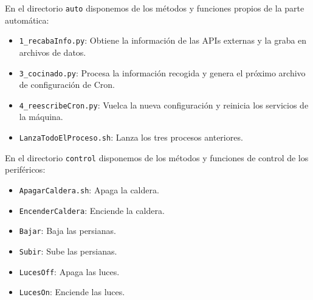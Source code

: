 En el directorio \texttt{auto} disponemos de los métodos y funciones propios de la parte automática:
\begin{itemize}
    \item \texttt{1\_recabaInfo.py}: Obtiene la información de las APIs externas y la graba en archivos de datos.
    \item \texttt{3\_cocinado.py}: Procesa la información recogida y genera el próximo archivo de configuración de Cron.
    \item \texttt{4\_reescribeCron.py}: Vuelca la nueva configuración y reinicia los servicios de la máquina.
    \item \texttt{LanzaTodoElProceso.sh}: Lanza los tres procesos anteriores.
\end{itemize}

En el directorio \texttt{control} disponemos de los métodos y funciones de control de los periféricos:
\begin{itemize}
    \item \texttt{ApagarCaldera.sh}: Apaga la caldera.
    \item \texttt{EncenderCaldera}: Enciende la caldera.
    \item \texttt{Bajar}: Baja las persianas.
    \item \texttt{Subir}: Sube las persianas.
    \item \texttt{LucesOff}: Apaga las luces.
    \item \texttt{LucesOn}: Enciende las luces.
\end{itemize}

